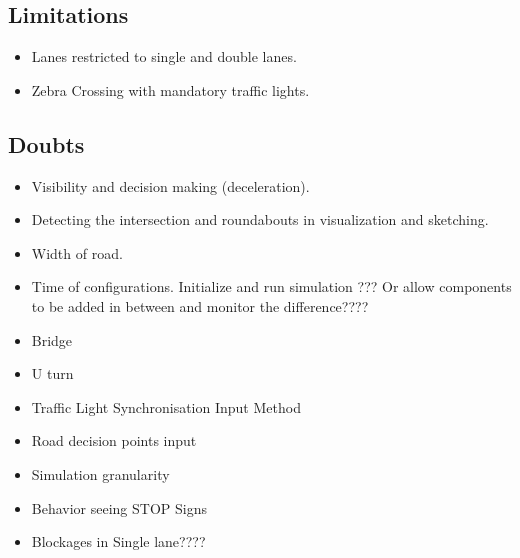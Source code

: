 \documentclass[11pt]{article}
\begin{document}
	\subsection{Limitations}
		\begin{itemize}
			\item Lanes restricted to single and double lanes.
			\item Zebra Crossing with mandatory traffic lights.
	\end{itemize}	

	\subsection{Doubts}
		\begin{itemize}
			\item Visibility and decision making (deceleration).
			\item Detecting the intersection and roundabouts in visualization and sketching.
			\item Width of road.
			\item Time of configurations. Initialize and run simulation ??? Or allow components to be added in between and monitor the difference????
			\item Bridge
			\item U turn
			\item Traffic Light Synchronisation Input Method
			\item Road decision points input
			\item Simulation granularity
			\item Behavior seeing STOP Signs
			\item Blockages in Single lane????
	\end{itemize}	
	
\end{document}
